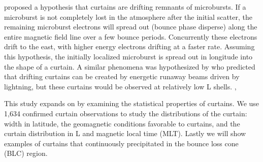 \documentclass[draft]{agujournal2019}
\begin{document}
 proposed a hypothesis that curtains are drifting remnants of microbursts. If a microburst is not completely lost in the atmosphere after the initial scatter, the remaining microburst electrons will spread out (bounce phase disperse) along the entire magnetic field line over a few bounce periods. Concurrently these electrons drift to the east, with higher energy electrons drifting at a faster rate. Assuming this hypothesis, the initially localized microburst is spread out in longitude into the shape of a curtain. A similar phenomena was hypothesized by  who predicted that drifting curtains can be created by energetic runaway beams driven by lightning, but these curtains would be observed at relatively low L shells.  , 

This study expands on  by examining the statistical properties of curtains. We use 1,634 confirmed curtain observations to study the distributions of the curtain: width in latitude, the geomagnetic conditions favorable to curtains, and the curtain distribution in L and magnetic local time (MLT). Lastly we will show examples of curtains that continuously precipitated in the bounce loss cone (BLC) region.
\end{document}
